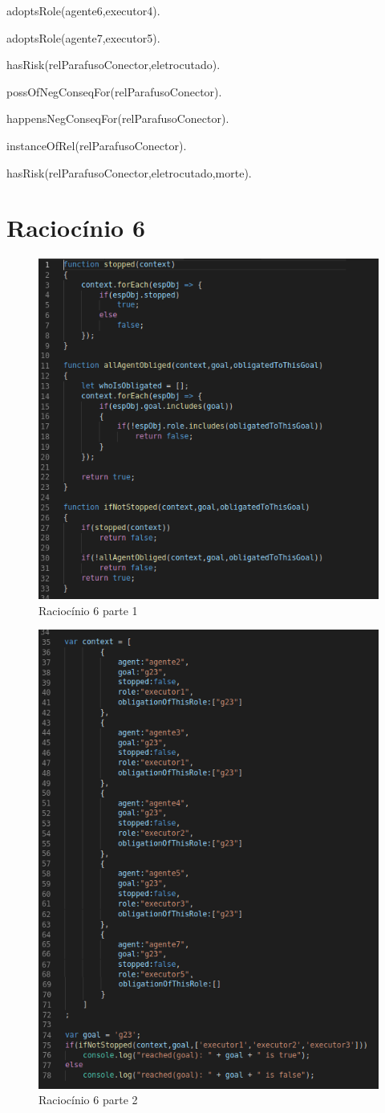 adoptsRole(agente6,executor4).

adoptsRole(agente7,executor5).

hasRisk(relParafusoConector,eletrocutado).

possOfNegConseqFor(relParafusoConector).

happensNegConseqFor(relParafusoConector).

instanceOfRel(relParafusoConector).

hasRisk(relParafusoConector,eletrocutado,morte).

\section{Raciocínio 6}


\begin{figure}[H]
  \centering
  \includegraphics[width=0.8\linewidth]{figure/algjs} 
  \caption{Raciocínio 6 parte 1}
  \label{atividiagram2}
\end{figure}


\begin{figure}[H]
  \centering
  \includegraphics[width=0.8\linewidth]{figure/algjs2} 
  \caption{Raciocínio 6 parte 2}
  \label{atividiagram2}
\end{figure}
